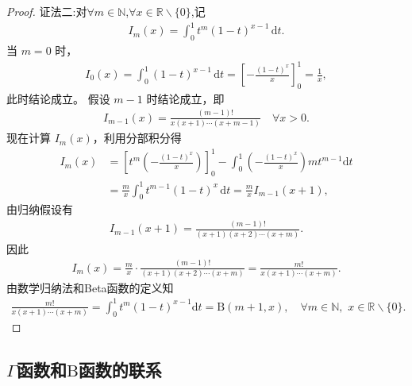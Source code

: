 \documentclass[../../main.tex]{subfiles}%
\begin{document}
\begin{proof}
{\color{blue}证法二:}对$\forall m\in \mathbb{N}$,$\forall x\in \mathbb{R} \backslash \{0\}$,记
\begin{align*}
I_m(x)=\int_0^1 t^m(1-t)^{x-1}\,\mathrm{d}t.
\end{align*}
当 $m=0$ 时，
\begin{align*}
I_0(x)=\int_0^1 (1-t)^{x-1}\,\mathrm{d}t=\left[-\frac{(1-t)^x}{x}\right]_0^1=\frac{1}{x},
\end{align*}
此时结论成立。
假设 $m-1$ 时结论成立，即
\begin{align*}
I_{m-1}(x)=\frac{(m-1)!}{x(x+1)\cdots(x+m-1)} \quad \forall x>0.
\end{align*}
现在计算 $I_m(x)$，利用分部积分得
\begin{align*}
I_m(x)&=\left[t^m\left(-\frac{(1-t)^x}{x}\right)\right]_0^1
-\int_0^1 \left(-\frac{(1-t)^x}{x}\right)m t^{m-1}\mathrm{d}t \\
&=\frac{m}{x}\int_0^1 t^{m-1}(1-t)^x\,\mathrm{d}t 
=\frac{m}{x} I_{m-1}(x+1),
\end{align*}
由归纳假设有
\begin{align*}
I_{m-1}(x+1)=\frac{(m-1)!}{(x+1)(x+2)\cdots(x+m)}.
\end{align*}
因此
\begin{align*}
I_m(x)=\frac{m}{x}\cdot \frac{(m-1)!}{(x+1)(x+2)\cdots(x+m)}
=\frac{m!}{x(x+1)\cdots(x+m)}.
\end{align*}
由数学归纳法和Beta函数的定义知
\begin{align*}
\frac{m!}{x(x+1)\cdots(x+m)}=\int_0^1{t^m\left( 1-t \right) ^{x-1}\mathrm{d}t}=\mathrm{B}\left( m+1,x \right) ,\quad \forall m\in \mathbb{N} ,\,\,x\in \mathbb{R} \backslash \{0\}.
\end{align*}
\end{proof}




\subsection{$\Gamma$函数和$\mathrm{B}$函数的联系}
\end{document}

